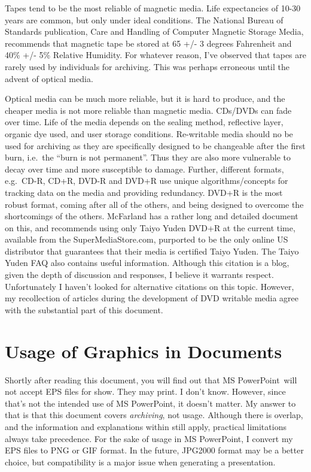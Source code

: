 \documentclass[a4paper]{article}
\begin{document}
Tapes tend to be the most reliable of magnetic media. Life expectancies
of 10-30 years are common, but only under ideal conditions. The National
Bureau of Standards publication, Care and Handling of Computer Magnetic
Storage Media, recommends that magnetic tape be stored at 65 +/- 3
degrees Fahrenheit and 40\% +/- 5\% Relative Humidity. For whatever
reason, I’ve observed that tapes are rarely used by individuals for
archiving. This was perhaps erroneous until the advent of optical media.

Optical media can be much more reliable, but it is hard to produce, and
the cheaper media is not more reliable than magnetic media. CDs/DVDs can
fade over time. Life of the media depends on the sealing method,
reflective layer, organic dye used, and user storage conditions.
Re-writable media should no be used for archiving as they are
specifically designed to be changeable after the first burn, i.e.~the
“burn is not permanent”. Thus they are also more vulnerable to decay
over time and more susceptible to damage. Further, different formats,
e.g.~CD-R, CD+R, DVD-R and DVD+R use unique algorithms/concepts for
tracking data on the media and providing redundancy. DVD+R is the most
robust format, coming after all of the others, and being designed to
overcome the shortcomings of the others. McFarland has a rather long and
detailed document on this, and recommends using only Taiyo Yuden DVD+R
at the current time, available from the SuperMediaStore.com, purported
to be the only online US distributor that guarantees that their media is
certified Taiyo Yuden. The Taiyo Yuden FAQ also contains useful
information. Although this citation is a blog, given the depth of
discussion and responses, I believe it warrants respect. Unfortunately I
haven't looked for alternative citations on this topic. However, my
recollection of articles during the development of DVD writable media
agree with the substantial part of this document.


\section{Usage of Graphics in Documents%
  \label{usage-of-graphics-in-documents}%
}

Shortly after reading this document, you will find out that MS
PowerPoint~will not accept EPS files for show. They may print. I don't
know. However, since that’s not the intended use of MS PowerPoint, it
doesn't matter. My answer to that is that this document covers
\emph{archiving}, not usage. Although there is overlap, and the information
and explanations within still apply, practical limitations always take
precedence. For the sake of usage in MS PowerPoint, I convert my EPS
files to PNG or GIF format. In the future, JPG2000 format may be a
better choice, but compatibility is a major issue when generating a
presentation.
\end{document}
